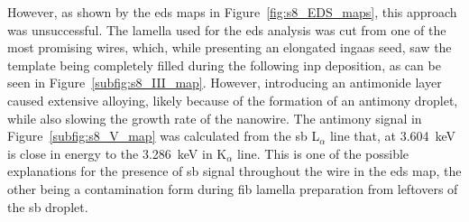 However, as shown by the \acs{eds} maps in Figure~\ref{fig:s8_EDS_maps}, this approach was unsuccessful. The lamella used for the \acs{eds} analysis was cut from one of the most promising wires, which, while presenting an elongated \acs{ingaas} seed, saw the template being completely filled during the following \acs{inp} deposition, as can be seen in Figure~\ref{subfig:s8_III_map}. However, introducing an antimonide layer caused extensive alloying, likely because of the formation of an antimony droplet, while also slowing the growth rate of the nanowire. The antimony signal in Figure~\ref{subfig:s8_V_map} was calculated from the \acl{sb} L\(_\alpha\) line that, at \qty{3.604}{\kilo\eV} is close in energy to the \qty{3.286}{\kilo\eV} \acl{in} K\(_\alpha\) line. This is one of the possible explanations for the presence of \acl{sb} signal throughout the wire in the \acs{eds} map, the other being a contamination form during \acs{fib} lamella preparation from leftovers of the \acl{sb} droplet.

